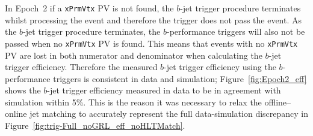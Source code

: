 In Epoch~2 if a \verb|xPrmVtx| PV is not found, the $b$-jet trigger procedure terminates whilst processing the event and therefore the trigger does not pass the event.
As the $b$-jet trigger procedure terminates, the $b$-performance triggers will also not be passed when no \verb|xPrmVtx| PV is found.
This means that events with no \verb|xPrmVtx| PV are lost in both numerator and denominator when calculating the $b$-jet trigger efficiency.
Therefore the measured $b$-jet trigger efficiency using the $b$-performance triggers is consistent in data and simulation;
Figure~\ref{fig:Epoch2_eff} shows the $b$-jet trigger efficiency measured in data to be in agreement with simulation within 5\%.
This is the reason it was necessary to relax the offline--online jet matching to accurately represent the full data-simulation discrepancy in Figure~\ref{fig:trig-Full_noGRL_eff_noHLTMatch}.

